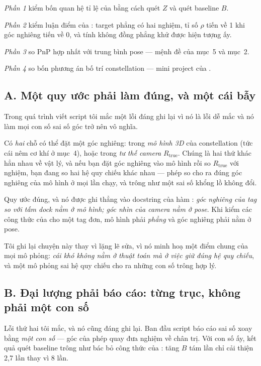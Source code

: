 \documentclass[../../marker.tex]{subfiles}
\begin{document}
\emph{Phần 1} kiểm bốn quan hệ tỉ lệ của  bằng cách quét \(Z\) và quét baseline \(B\).

\emph{Phần 2} kiểm luận điểm của : target phẳng có hai nghiệm, tỉ số \(\rho\) tiến về 1 khi góc nghiêng tiến về 0, và tính không đồng phẳng khử được hiện tượng ấy.

\emph{Phần 3} so PnP hợp nhất với trung bình pose --- mệnh đề của  mục~5 và  mục~2.

\emph{Phần 4} so bốn phương án bố trí constellation --- mini project của .

\subsection{A. Một quy ước phải làm đúng, và một cái bẫy}

Trong quá trình viết script tôi mắc một lỗi đáng ghi lại vì nó là lỗi dễ mắc và nó làm mọi con số sai số góc trở nên vô nghĩa.

Có \emph{hai} chỗ có thể đặt một góc nghiêng: trong \emph{mô hình 3D} của constellation (tức cái nêm cơ khí ở  mục~4), hoặc trong \emph{tư thế camera} \(R_{\text{true}}\). Chúng là hai thứ khác hẳn nhau về vật lý, và nếu bạn đặt góc nghiêng vào mô hình rồi so \(R_{\text{true}}\) với nghiệm, bạn đang so hai hệ quy chiếu khác nhau --- phép so cho ra đúng góc nghiêng của mô hình ở mọi lần chạy, và trông như một sai số khổng lồ không đổi.

Quy ước đúng, và nó được ghi thẳng vào docstring của hàm : \emph{góc nghiêng của tag so với tấm dock nằm ở mô hình; góc nhìn của camera nằm ở pose}. Khi kiểm các công thức của  cho một tag đơn, mô hình phải \emph{phẳng} và góc nghiêng phải nằm ở pose.

Tôi ghi lại chuyện này thay vì lặng lẽ sửa, vì nó minh hoạ một điểm chung của mọi mô phỏng: \emph{cái khó không nằm ở thuật toán mà ở việc giữ đúng hệ quy chiếu}, và một mô phỏng sai hệ quy chiếu cho ra những con số trông hợp lý.

\subsection{B. Đại lượng phải báo cáo: từng trục, không phải một con số}

Lỗi thứ hai tôi mắc, và nó cũng đáng ghi lại. Ban đầu script báo cáo sai số xoay bằng \emph{một con số} --- góc của phép quay đưa nghiệm về chân trị. Với con số ấy, kết quả quét baseline trông như bác bỏ công thức của : tăng \(B\) tám lần chỉ cải thiện 2,7 lần thay vì 8 lần.
\end{document}
